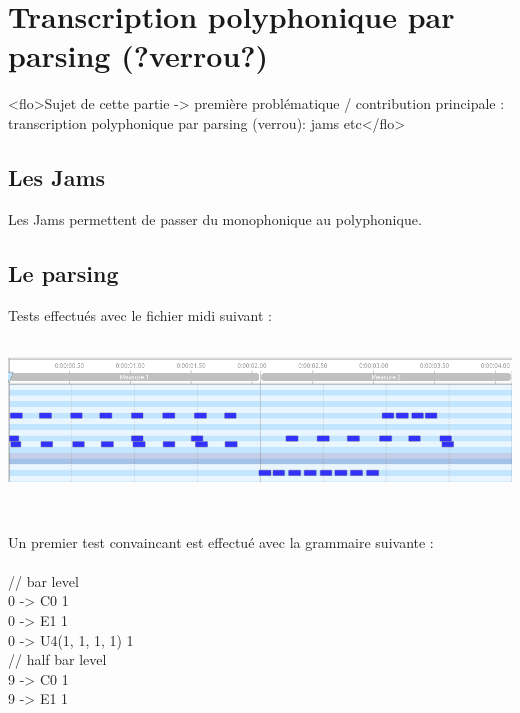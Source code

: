 \section{Transcription polyphonique par parsing (?verrou?)}
<flo>Sujet de cette partie -> première problématique / contribution
principale : transcription polyphonique par parsing (verrou): jams etc</flo>

\subsection*{Les Jams}
Les Jams permettent de passer du monophonique au polyphonique.
\label{jam_tests}

\subsection*{Le parsing}
\label{gram_pond}

Tests effectués avec le fichier midi suivant :
\includegraphics[height=50mm, width=160mm]{z_images/4_experimentations/3_developpement/0_midi_2bars_fill.png}

Un premier test convaincant est effectué avec la grammaire suivante :\\\\
// bar level\\
0 -> C0                1\\
0 -> E1                1\\
0 -> U4(1, 1, 1, 1)    1\\

// half bar level\\
9 -> C0                1\\
9 -> E1                1\\

